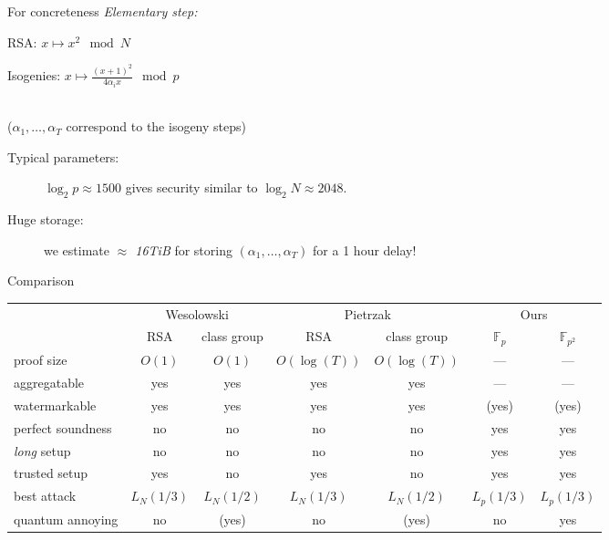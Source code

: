 \documentclass[aspectratio=169]{beamer}
\newcommand{\F}{\mathbb{F}}
\begin{document}

\begin{frame}{For concreteness}
  \emph{Elementary step:}
  \medskip
  
  \hspace{2em} RSA: \hfill $x \longmapsto x^2\mod N$ \hspace{4em}

  \vfill
  \hspace{2em} Isogenies: \hfill $\displaystyle x \longmapsto \frac{(x+1)^2}{4\alpha_ix}\mod p$ \hspace{4em}\strut\\
  {\hspace{2em}\normalsize\color{gray} ($\alpha_1,\dots,\alpha_T$ correspond to the isogeny steps)}

  \vfill
  \begin{description}
  \item[Typical parameters:] \emph{$\log_2 p \approx 1500$} gives
    security similar to $\log_2 N \approx 2048$.
  \item[Huge storage:] we estimate \emph{$\approx$ 16TiB} for storing
    $(\alpha_1,\dots,\alpha_T)$ for a 1 hour delay!
  \end{description}
\end{frame}


\begin{frame}{Comparison}
  \begin{tabular}{l | c c | c c | c c}
    & \multicolumn{2}{c|}{Wesolowski} & \multicolumn{2}{c|}{Pietrzak} & \multicolumn{2}{c}{Ours}\\
    & RSA & class group & RSA & class group & $\F_p$ & $\F_{p^2}$\\
    \hline
    proof size    & $O(1)$ & $O(1)$ & $O(\log(T))$ & $O(\log(T))$ & --- & ---\\
    aggregatable  & yes & yes & yes & yes & --- & ---\\
    watermarkable & yes & yes & yes & yes & (yes) & (yes)\\
    perfect soundness & no & no & no & no & yes & yes\\
    \textit{long} setup & no & no & no & no & \alert{yes} & \alert{yes}\\
    trusted setup & \alert{yes} & no & \alert{yes} & no & \alert{yes} & \alert{yes}\\
    best attack   & $L_N(1/3)$ & $L_N(1/2)$ & $L_N(1/3)$ & $L_N(1/2)$ & $L_p(1/3)$ & $L_p(1/3)$\\
    quantum annoying & no & (yes) & no & (yes) & no & yes\\
  \end{tabular}
\end{frame}
\end{document}
